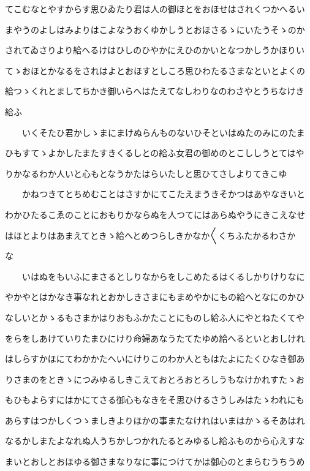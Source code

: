 \documentclass[a4paper,11pt,landscape]{ltjtarticle}
\begin{document}
てこむなとやすからす思ひゐたり君は人の御ほとをおほせはされくつかへるい
\par\medskip
まやうのよしはみよりはこよなうおくゆかしうとおほさるゝにいたうそゝのか
\par\medskip
されてゐさりより給へるけはひしのひやかにえひのかいとなつかしうかほりい
\par\medskip
てゝおほとかなるをされはよとおほすとしころ思ひわたるさまなといとよくの
\par\medskip
給つゝくれとましてちかき御いらへはたえてなしわりなのわさやとうちなけき
\par\medskip
給ふ
\par\medskip
　　いくそたひ君かしゝまにまけぬらんものないひそといはぬたのみにのたま
\par\medskip
ひもすてゝよかしたまたすきくるしとの給ふ女君の御めのとこししうとてはや
\par\medskip
りかなるわか人いと心もとなうかたはらいたしと思ひてさしよりてきこゆ
\par\medskip
　　かねつきてとちめむことはさすかにてこたえまうきそかつはあやなきいと
\par\medskip
わかひたるこゑのことにおもりかならぬを人つてにはあらぬやうにきこえなせ
\par\medskip
はほとよりはあまえてときゝ給へとめつらしきかなか〱くちふたかるわさか
\par\medskip
な
\par\medskip
　　いはぬをもいふにまさるとしりなからをしこめたるはくるしかりけりなに
\par\medskip
やかやとはかなき事なれとおかしきさまにもまめやかにもの給へとなにのかひ
\par\medskip
なしいとかゝるもさまかはりおもふかたことにものし給ふ人にやとねたくてや
\par\medskip
をらをしあけていりたまひにけり命婦あなうたてたゆめ給へるといとおしけれ
\par\medskip
はしらすかほにてわかかたへいにけりこのわか人ともはたよにたくひなき御あ
\par\medskip
りさまのをときゝにつみゆるしきこえておとろおとろしうもなけかれすたゝお
\par\medskip
もひもよらすにはかにてさる御心もなきをそ思ひけるさうしみはたゝわれにも
\par\medskip
あらすはつかしくつゝましきよりほかの事またなけれはいまはかゝるそあはれ
\par\medskip
なるかしまたよなれぬ人うちかしつかれたるとみゆるし給ふものから心えすな
\par\medskip
まいとおしとおほゆる御さまなりなに事につけてかは御心のとまらむうちうめ
\end{document}
